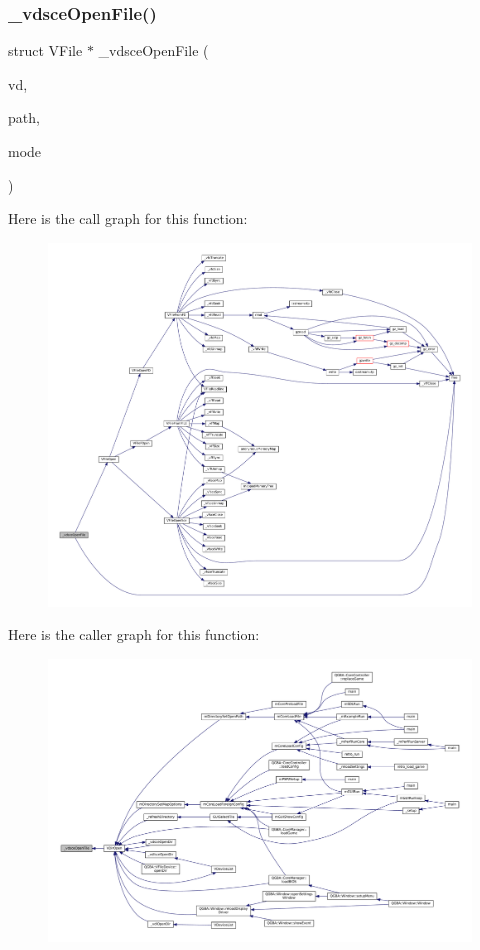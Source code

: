 \subsubsection{\texorpdfstring{\+\_\+vdsce\+Open\+File()}{\_vdsceOpenFile()}}
{\footnotesize\ttfamily struct V\+File $\ast$ \+\_\+vdsce\+Open\+File (\begin{DoxyParamCaption}\item[{struct V\+Dir $\ast$}]{vd,  }\item[{const char $\ast$}]{path,  }\item[{\mbox{\hyperlink{ioapi_8h_a787fa3cf048117ba7123753c1e74fcd6}{int}}}]{mode }\end{DoxyParamCaption})\hspace{0.3cm}{\ttfamily [static]}}

Here is the call graph for this function\+:
\nopagebreak
\begin{figure}[H]
\begin{center}
\leavevmode
\includegraphics[width=350pt]{sce-vfs_8c_aa6c4428f224691c2646883dde2b7936d_cgraph}
\end{center}
\end{figure}
Here is the caller graph for this function\+:
\nopagebreak
\begin{figure}[H]
\begin{center}
\leavevmode
\includegraphics[width=350pt]{sce-vfs_8c_aa6c4428f224691c2646883dde2b7936d_icgraph}
\end{center}
\end{figure}
